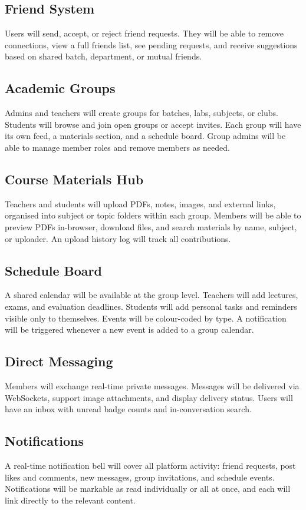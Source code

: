 \documentclass[11pt,a4paper]{article}
\begin{document}
\subsection{Friend System}
Users will send, accept, or reject friend requests. They will be able to remove connections, view a full friends list, see pending requests, and receive suggestions based on shared batch, department, or mutual friends.

\subsection{Academic Groups}
Admins and teachers will create groups for batches, labs, subjects, or clubs. Students will browse and join open groups or accept invites. Each group will have its own feed, a materials section, and a schedule board. Group admins will be able to manage member roles and remove members as needed.

\subsection{Course Materials Hub}
Teachers and students will upload PDFs, notes, images, and external links, organised into subject or topic folders within each group. Members will be able to preview PDFs in-browser, download files, and search materials by name, subject, or uploader. An upload history log will track all contributions.

\subsection{Schedule Board}
A shared calendar will be available at the group level. Teachers will add lectures, exams, and evaluation deadlines. Students will add personal tasks and reminders visible only to themselves. Events will be colour-coded by type. A notification will be triggered whenever a new event is added to a group calendar.

\subsection{Direct Messaging}
Members will exchange real-time private messages. Messages will be delivered via WebSockets, support image attachments, and display delivery status. Users will have an inbox with unread badge counts and in-conversation search.

\subsection{Notifications}
A real-time notification bell will cover all platform activity: friend requests, post likes and comments, new messages, group invitations, and schedule events. Notifications will be markable as read individually or all at once, and each will link directly to the relevant content.
\end{document}
